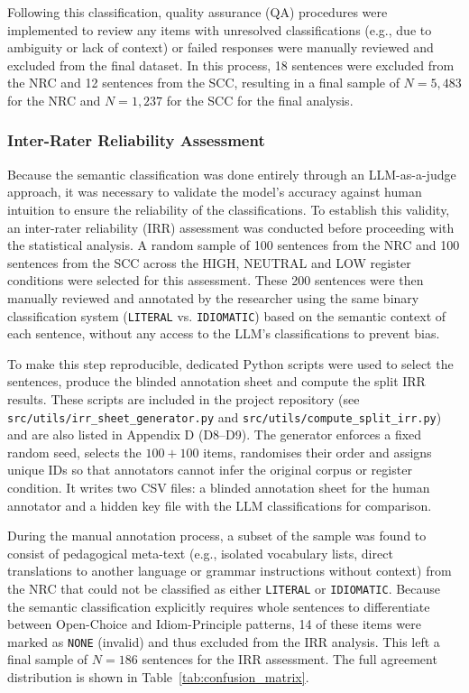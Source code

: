 \documentclass[11pt,a4paper]{article}
\begin{document}
Following this classification, quality assurance (QA) procedures were implemented to review any items with unresolved classifications (e.g., due to ambiguity or lack of context) or failed responses were manually reviewed and excluded from the final dataset. In this process, 18 sentences were excluded from the NRC and 12 sentences from the SCC, resulting in a final sample of $N=5{,}483$ for the NRC and $N=1{,}237$ for the SCC for the final analysis.

\subsubsection{Inter-Rater Reliability Assessment}\label{subsubsec:irr-assessment}

Because the semantic classification was done entirely through an LLM-as-a-judge approach, it was necessary to validate the model's accuracy against human intuition to ensure the reliability of the classifications. To establish this validity, an inter-rater reliability (IRR) assessment was conducted before proceeding with the statistical analysis. A random sample of 100 sentences from the NRC and 100 sentences from the SCC across the HIGH, NEUTRAL and LOW register conditions were selected for this assessment. These 200 sentences were then manually reviewed and annotated by the researcher using the same binary classification system (\texttt{LITERAL} vs. \texttt{IDIOMATIC}) based on the semantic context of each sentence, without any access to the LLM's classifications to prevent bias.

To make this step reproducible, dedicated Python scripts were used to select the sentences, produce the blinded annotation sheet and compute the split IRR results. These scripts are included in the project repository (see \texttt{src/utils/irr\_sheet\_generator.py} and \texttt{src/utils/compute\_split\_irr.py}) and are also listed in Appendix D (D8--D9). The generator enforces a fixed random seed, selects the $100+100$ items, randomises their order and assigns unique IDs so that annotators cannot infer the original corpus or register condition. It writes two CSV files: a blinded annotation sheet for the human annotator and a hidden key file with the LLM classifications for comparison.

During the manual annotation process, a subset of the sample was found to consist of pedagogical meta-text (e.g., isolated vocabulary lists, direct translations to another language or grammar instructions without context) from the NRC that could not be classified as either \texttt{LITERAL} or \texttt{IDIOMATIC}. Because the semantic classification explicitly requires whole sentences to differentiate between Open-Choice and Idiom-Principle patterns, 14 of these items were marked as \texttt{NONE} (invalid) and thus excluded from the IRR analysis. This left a final sample of $N=186$ sentences for the IRR assessment. The full agreement distribution is shown in Table~\ref{tab:confusion_matrix}.
\end{document}
